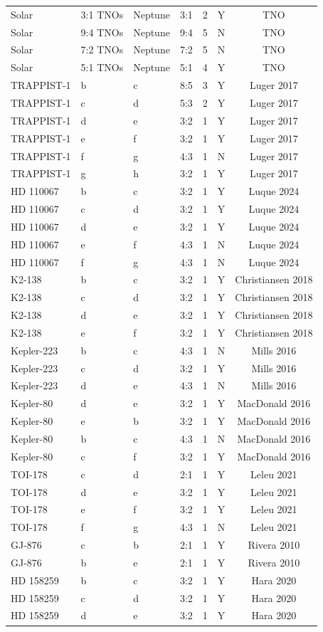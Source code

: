 \documentclass[twocolumn,11pt]{article}
\begin{document}
\begin{table}[ht]
\begin{tabular}{llllccc}
Solar & 3:1 TNOs & Neptune & 3:1 & 2 & Y & TNO \\
Solar & 9:4 TNOs & Neptune & 9:4 & 5 & N & TNO \\
Solar & 7:2 TNOs & Neptune & 7:2 & 5 & N & TNO \\
Solar & 5:1 TNOs & Neptune & 5:1 & 4 & Y & TNO \\
\midrule
TRAPPIST-1 & b & c & 8:5 & 3 & Y & Luger 2017 \\
TRAPPIST-1 & c & d & 5:3 & 2 & Y & Luger 2017 \\
TRAPPIST-1 & d & e & 3:2 & 1 & Y & Luger 2017 \\
TRAPPIST-1 & e & f & 3:2 & 1 & Y & Luger 2017 \\
TRAPPIST-1 & f & g & 4:3 & 1 & N & Luger 2017 \\
TRAPPIST-1 & g & h & 3:2 & 1 & Y & Luger 2017 \\
\midrule
HD 110067 & b & c & 3:2 & 1 & Y & Luque 2024 \\
HD 110067 & c & d & 3:2 & 1 & Y & Luque 2024 \\
HD 110067 & d & e & 3:2 & 1 & Y & Luque 2024 \\
HD 110067 & e & f & 4:3 & 1 & N & Luque 2024 \\
HD 110067 & f & g & 4:3 & 1 & N & Luque 2024 \\
\midrule
K2-138 & b & c & 3:2 & 1 & Y & Christiansen 2018 \\
K2-138 & c & d & 3:2 & 1 & Y & Christiansen 2018 \\
K2-138 & d & e & 3:2 & 1 & Y & Christiansen 2018 \\
K2-138 & e & f & 3:2 & 1 & Y & Christiansen 2018 \\
\midrule
Kepler-223 & b & c & 4:3 & 1 & N & Mills 2016 \\
Kepler-223 & c & d & 3:2 & 1 & Y & Mills 2016 \\
Kepler-223 & d & e & 4:3 & 1 & N & Mills 2016 \\
\midrule
Kepler-80 & d & e & 3:2 & 1 & Y & MacDonald 2016 \\
Kepler-80 & e & b & 3:2 & 1 & Y & MacDonald 2016 \\
Kepler-80 & b & c & 4:3 & 1 & N & MacDonald 2016 \\
Kepler-80 & c & f & 3:2 & 1 & Y & MacDonald 2016 \\
\midrule
TOI-178 & c & d & 2:1 & 1 & Y & Leleu 2021 \\
TOI-178 & d & e & 3:2 & 1 & Y & Leleu 2021 \\
TOI-178 & e & f & 3:2 & 1 & Y & Leleu 2021 \\
TOI-178 & f & g & 4:3 & 1 & N & Leleu 2021 \\
\midrule
GJ-876 & c & b & 2:1 & 1 & Y & Rivera 2010 \\
GJ-876 & b & e & 2:1 & 1 & Y & Rivera 2010 \\
\midrule
HD 158259 & b & c & 3:2 & 1 & Y & Hara 2020 \\
HD 158259 & c & d & 3:2 & 1 & Y & Hara 2020 \\
HD 158259 & d & e & 3:2 & 1 & Y & Hara 2020 \\
\bottomrule
\end{tabular}
\end{table}



\end{document}
